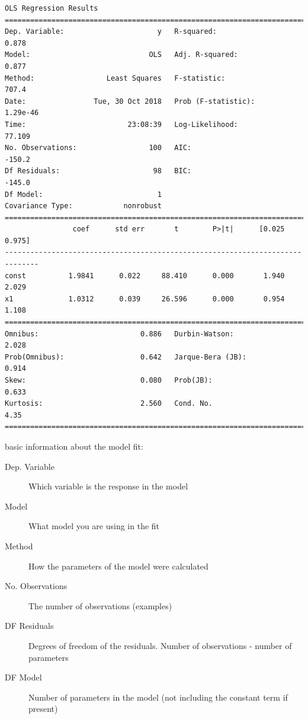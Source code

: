 \begin{refsection}
\begin{verbatim}
OLS Regression Results                            
==============================================================================
Dep. Variable:                      y   R-squared:                       0.878
Model:                            OLS   Adj. R-squared:                  0.877
Method:                 Least Squares   F-statistic:                     707.4
Date:                Tue, 30 Oct 2018   Prob (F-statistic):           1.29e-46
Time:                        23:08:39   Log-Likelihood:                 77.109
No. Observations:                 100   AIC:                            -150.2
Df Residuals:                      98   BIC:                            -145.0
Df Model:                           1                                         
Covariance Type:            nonrobust                                         
==============================================================================
                coef      std err       t        P>|t|      [0.025      0.975]
------------------------------------------------------------------------------
const          1.9841      0.022     88.410      0.000       1.940       2.029
x1             1.0312      0.039     26.596      0.000       0.954       1.108
==============================================================================
Omnibus:                        0.886   Durbin-Watson:                   2.028
Prob(Omnibus):                  0.642   Jarque-Bera (JB):                0.914
Skew:                           0.080   Prob(JB):                        0.633
Kurtosis:                       2.560   Cond. No.                         4.35
==============================================================================
\end{verbatim}

basic information about the model fit:
\begin{description}
	\item[Dep. Variable] Which variable is the response in the model
	\item[Model]	What model you are using in the fit
	\item[Method]	How the parameters of the model were calculated
	\item[No. Observations]	The number of observations (examples)
	\item[DF Residuals]	Degrees of freedom of the residuals. Number of observations - number of parameters
	\item[DF Model]	Number of parameters in the model (not including the constant term if present)
\end{description}	


\end{refsection}
